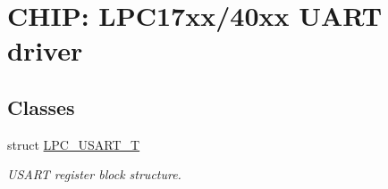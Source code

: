 \hypertarget{group__UART__17XX__40XX}{}\section{C\+H\+IP\+: L\+P\+C17xx/40xx U\+A\+RT driver}
\label{group__UART__17XX__40XX}
\subsection*{Classes}
\begin{DoxyCompactItemize}
\item 
struct \hyperlink{structLPC__USART__T}{L\+P\+C\+\_\+\+U\+S\+A\+R\+T\+\_\+T}
\begin{DoxyCompactList}\small\item\em U\+S\+A\+RT register block structure. \end{DoxyCompactList}\end{DoxyCompactItemize}
